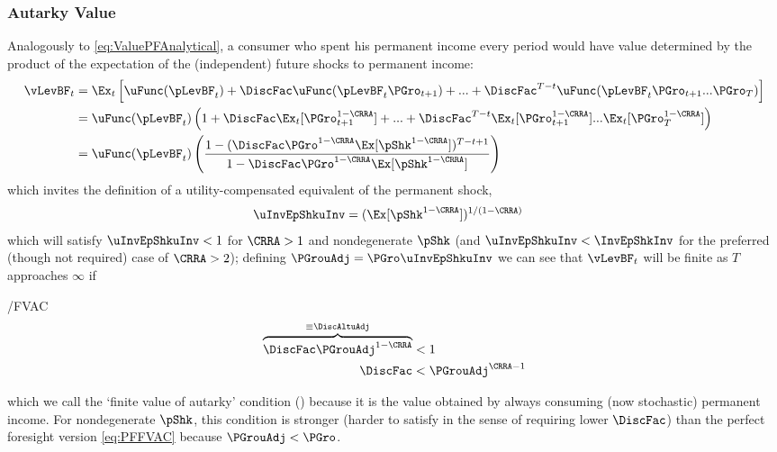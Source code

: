 \documentclass[./BufferStockTheory.tex]{subfiles}
\begin{document}
\hypertarget{Autarky-Value}{}
\subsubsection{Autarky Value}
Analogously to \eqref{eq:ValuePFAnalytical}, a consumer who spent his permanent income every period would have value determined by the product of the expectation of the (independent) future shocks to permanent income:
\begin{align*}
      \vLevBF_{t}  & = \Ex_{t}\left[\uFunc(\pLevBF_{t}) + \DiscFac \uFunc(\pLevBF_{t}\PGro_{t+1}) + ... + \DiscFac^{T-t}\uFunc(\pLevBF_{t}\PGro_{t+1}...\PGro_{T})\right] \\
       & = \uFunc(\pLevBF_{t})\left(1+ \DiscFac \Ex_{t}[\PGro_{t+1}^{1-\CRRA}] +  ... + \DiscFac^{T-t}\Ex_{t}[\PGro_{t+1}^{1-\CRRA}]...\Ex_{t}[\PGro_{T}^{1-\CRRA}]\right) \\
       & = \uFunc(\pLevBF_{t})\left(\frac{1-(\DiscFac \PGro^{1-\CRRA}\Ex[\pShk^{1-\CRRA}])^{T-t+1}}{1-\DiscFac \PGro^{1-\CRRA} \Ex[\pShk^{1-\CRRA}]}\right)
      \end{align*}
which invites the definition of a utility-compensated equivalent of the permanent shock,
\begin{align*}
  \uInvEpShkuInv  & = (\Ex[\pShk^{1-\CRRA}])^{1/(1-\CRRA)}
\end{align*}
which will satisfy $\uInvEpShkuInv < 1$ for $\CRRA>1$ and nondegenerate $\pShk$ (and $\uInvEpShkuInv < \InvEpShkInv$ for the preferred (though not required) case of $\CRRA > 2$); defining $\PGrouAdj=\PGro \uInvEpShkuInv$ we can see that $\vLevBF_{t}$ will be finite as $T$ approaches $\infty$ if


\hypertarget{FVAC}{}
\begin{verbatimwrite}{\EqDir/FVAC}
\begin{equation}\begin{gathered}\begin{aligned}
\overbrace{\DiscFac \PGrouAdj^{1-\CRRA} }^{\equiv \DiscAltuAdj}  & < 1 \label{eq:FVAC}
\\ \DiscFac  & < \PGrouAdj^{\CRRA-1} \notag
\end{aligned}\end{gathered}\end{equation}
\end{verbatimwrite}
 which we call the `finite value of autarky'
condition (\FVAC) because it is the value obtained by always consuming
(now stochastic) permanent income.  For nondegenerate $\pShk$, this condition is stronger
(harder to satisfy in the sense of requiring lower $\DiscFac$) than
the perfect foresight version \eqref{eq:PFFVAC} because $\PGrouAdj <
\PGro$.  
\end{document}
